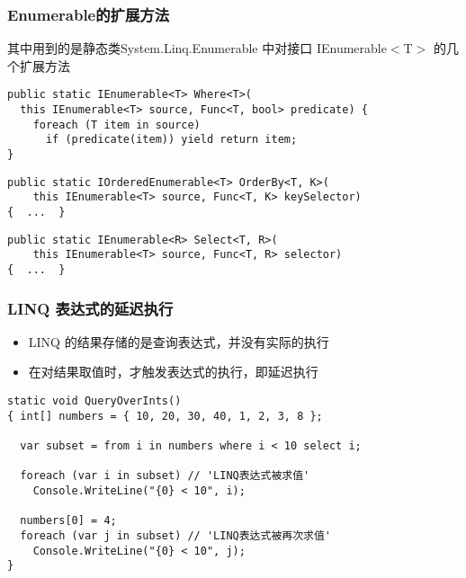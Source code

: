 \begin{frame}[fragile]
\frametitle{Enumerable的扩展方法}

\CJKindent 其中用到的是静态类System.Linq.Enumerable 中对接口 IEnumerable$<$T$>$ 的几个扩展方法

\begin{lstlisting}
public static IEnumerable<T> Where<T>(
  this IEnumerable<T> source, Func<T, bool> predicate) {
    foreach (T item in source)
      if (predicate(item)) yield return item;
}
\end{lstlisting}
\begin{lstlisting}
public static IOrderedEnumerable<T> OrderBy<T, K>(
    this IEnumerable<T> source, Func<T, K> keySelector)
{  ...  }
\end{lstlisting}
\begin{lstlisting}
public static IEnumerable<R> Select<T, R>(
    this IEnumerable<T> source, Func<T, R> selector)
{  ...  }
\end{lstlisting}
\end{frame}

\begin{frame}[fragile]
\frametitle{LINQ 表达式的延迟执行}
\begin{itemize}
\item LINQ 的结果存储的是查询表达式，并没有实际的执行
\item 在对结果取值时，才触发表达式的执行，即延迟执行
\end{itemize}
\begin{lstlisting}[escapeinside='']
static void QueryOverInts()
{ int[] numbers = { 10, 20, 30, 40, 1, 2, 3, 8 };

  var subset = from i in numbers where i < 10 select i;

  foreach (var i in subset) // 'LINQ表达式被求值'
    Console.WriteLine("{0} < 10", i);

  numbers[0] = 4;
  foreach (var j in subset) // 'LINQ表达式被再次求值'
    Console.WriteLine("{0} < 10", j);
}
\end{lstlisting}
\end{frame}

